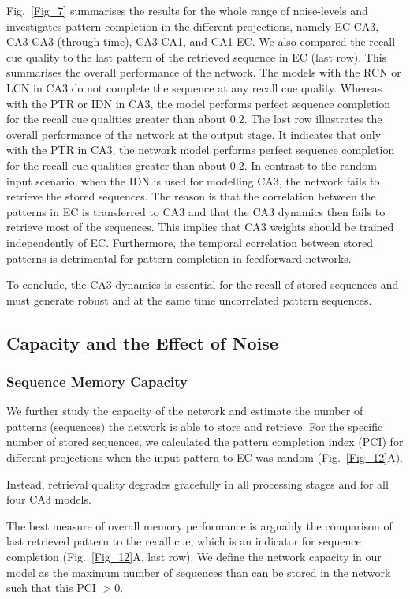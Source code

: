 \documentclass[utf8]{frontiersSCNS} %
\begin{document}
%
Fig.~\ref{Fig_7} summarises the results for the whole range of noise-levels and investigates pattern completion in the different projections, namely EC-CA3, CA3-CA3 (through time), CA3-CA1, and CA1-EC. 
We also compared the recall cue quality to the last pattern of the retrieved sequence in EC (last row). This summarises the overall performance of the network. The models with the RCN or LCN in CA3 do not complete the sequence at any recall cue quality. Whereas with the PTR or IDN in CA3, the model performs perfect sequence completion for the recall cue qualities greater than about $0.2$.
%
The last row illustrates the overall performance of the network at the output stage. It indicates that only with the PTR in CA3, the network model performs perfect sequence completion for the recall cue qualities greater than about $0.2$. In contrast to the random input scenario, when the IDN is used for modelling CA3, the network fails to retrieve the stored sequences. The reason is that the correlation between the patterns in EC is transferred to CA3 and that the CA3 dynamics then fails to retrieve most of the sequences. This implies that CA3 weights should be trained independently of EC. Furthermore, the temporal correlation between stored patterns is detrimental for pattern completion in feedforward networks. 

To conclude, the CA3 dynamics is essential for the recall of stored sequences and must generate robust and at the same time uncorrelated pattern sequences.          


\subsection{Capacity and the Effect of Noise}

\subsubsection{Sequence Memory Capacity}

We further study the capacity of the network and estimate the number of patterns (sequences) the network is able to store and retrieve. For the specific number of stored sequences, we calculated the pattern completion index (PCI) for different projections when the input pattern to EC was random (Fig.~\ref{Fig_12}A).

Instead, retrieval quality degrades gracefully in all processing stages and for all four CA3 models. 

The best measure of overall memory performance is arguably the comparison of last retrieved pattern to the recall cue, which is an indicator for sequence completion (Fig.~\ref{Fig_12}A, last row). We define the network capacity in our model as the maximum number of sequences than can be stored in the network such that this PCI $> 0$.
\end{document}

